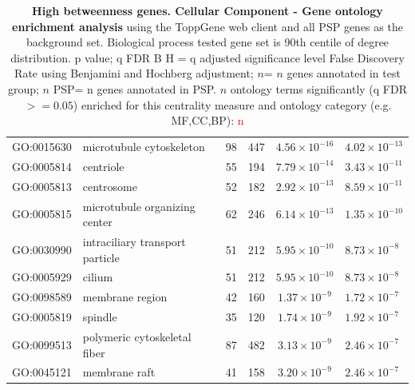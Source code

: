 \begin{table}[ht]
\begin{adjustbox}{width=\textwidth}
\begin{tabular}{@{}clllcl@{}}
  \midrule
GO:0015630 & microtubule cytoskeleton & 98 & 447 & $4.56 \times 10^{-16}$ & $4.02 \times 10^{-13}$ \\ 
  GO:0005814 & centriole & 55 & 194 & $7.79 \times 10^{-14}$ & $3.43 \times 10^{-11}$ \\ 
  GO:0005813 & centrosome & 52 & 182 & $2.92 \times 10^{-13}$ & $8.59 \times 10^{-11}$ \\ 
  GO:0005815 & microtubule organizing center & 62 & 246 & $6.14 \times 10^{-13}$ & $1.35 \times 10^{-10}$ \\ 
  GO:0030990 & intraciliary transport particle & 51 & 212 & $5.95 \times 10^{-10}$ & $8.73 \times 10^{-8}$ \\ 
  GO:0005929 & cilium & 51 & 212 & $5.95 \times 10^{-10}$ & $8.73 \times 10^{-8}$ \\ 
  GO:0098589 & membrane region & 42 & 160 & $1.37 \times 10^{-9}$ & $1.72 \times 10^{-7}$ \\ 
  GO:0005819 & spindle & 35 & 120 & $1.74 \times 10^{-9}$ & $1.92 \times 10^{-7}$ \\ 
  GO:0099513 & polymeric cytoskeletal fiber & 87 & 482 & $3.13 \times 10^{-9}$ & $2.46 \times 10^{-7}$ \\ 
  GO:0045121 & membrane raft & 41 & 158 & $3.20 \times 10^{-9}$ & $2.46 \times 10^{-7}$ \\ 
   \hline
\end{tabular}
\end{adjustbox}
\caption[Gene ontology enrichment High betweenness genes Cellular Component of genes above 90th centile of distribution]{\textbf{High betweenness genes. Cellular Component - Gene ontology enrichment analysis} using the ToppGene web client and all PSP genes as the background set.  Biological process tested gene set is 90th centile of degree distribution.  p value; q FDR B H = q adjusted significance level False Discovery Rate using Benjamini and Hochberg adjustment; $n$= $n$ genes annotated in test group; $n$ PSP= n genes annotated in PSP. $n$ ontology terms significantly (q FDR$>=0.05$) enriched for this centrality measure and ontology category (e.g. MF,CC,BP): \textcolor{red}{n}}
\label{tab:ToppGENE GO: Cellular Component. bet 90 centile cwpsp.txtp = p value; q FDR B H = q adjusted significance level False Discovery Rate using Benjamini and Hochberg adjustment; n= n genes annotated in test group; n PSP= n genes annotated in PSP}
\end{table}





